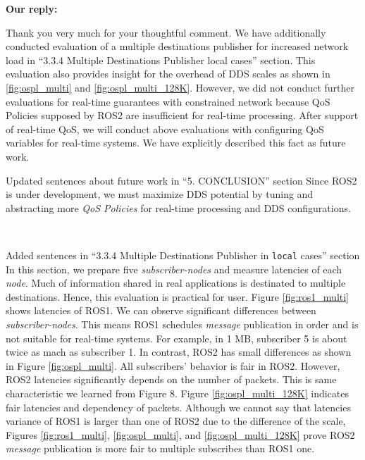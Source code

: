 \documentclass{article}
\begin{document}
\begin{enumerate}
  \begin{flushleft}
    \textbf{Our reply:}
  \end{flushleft}
  Thank you very much for your thoughtful comment.
  We have additionally conducted evaluation of a multiple destinations publisher for increased network load in ``3.3.4 Multiple Destinations Publisher local cases'' section.
  This evaluation also provides insight for the overhead of DDS scales as shown in \ref{fig:ospl_multi} and \ref{fig:ospl_multi_128K}.
  However, we did not conduct further evaluations for real-time guarantees with constrained network because QoS Policies supposed by ROS2 are insufficient for real-time processing.
  After support of real-time QoS, we will conduct above evaluations with configuring QoS variables for real-time systems.
  We have explicitly described this fact as future work.
  \begin{itembox}[|]{Updated sentences about future work in ``5. CONCLUSION'' section}
    Since ROS2 is under development, we must maximize DDS potential by tuning and abstracting more \emph{QoS Policies} for real-time processing and DDS configurations.
  \end{itembox}\\
  \begin{itembox}[|]{Added sentences in ``3.3.4 Multiple Destinations Publisher in \texttt{local} cases'' section}
    In this section, we prepare five \emph{subscriber-nodes} and measure latencies of each \emph{node}.
    Much of information shared in real applications is destinated to multiple destinations.
    Hence, this evaluation is practical for user.
    Figure \ref{fig:ros1_multi} shows latencies of ROS1.
    We can observe significant differences between \emph{subscriber-nodes}.
    This means ROS1 schedules \emph{message} publication in order and is not suitable for real-time systems.
    For example, in 1 MB, subscriber 5 is about twice as mach as subscriber 1.
    In contrast, ROS2 has small differences as shown in Figure \ref{fig:ospl_multi}.
    All subscribers' behavior is fair in ROS2.
    However, ROS2 latencies significantly depends on the number of packets.
    This is same characteristic we learned from Figure 8.
    Figure \ref{fig:ospl_multi_128K} indicates fair latencies and dependency of packets.
    Although we cannot say that latencies variance of ROS1 is larger than one of ROS2 due to the difference of the scale, Figures \ref{fig:ros1_multi}, \ref{fig:ospl_multi}, and \ref{fig:ospl_multi_128K} prove ROS2 \emph{message} publication is more fair to multiple subscribes than ROS1 one.

\end{itembox}
\end{enumerate}
\end{document}
